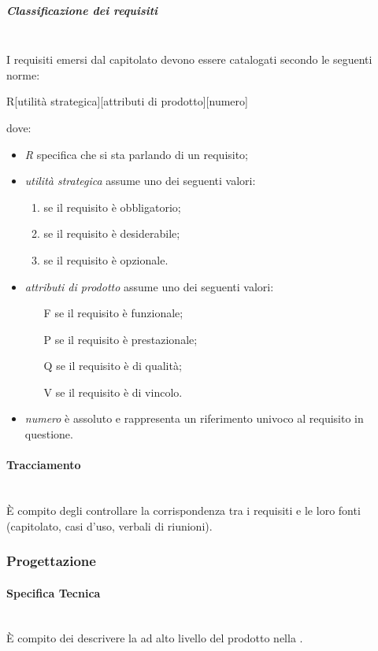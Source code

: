 \subparagraph{Classificazione dei requisiti}\mbox{}\\
I requisiti emersi dal capitolato devono essere catalogati secondo le seguenti norme:
\begin{center}
	R[utilità strategica][attributi di prodotto][numero]
\end{center}
dove:
\begin{itemize}
	\item \textit{R} specifica che si sta parlando di un requisito;
	\item \textit{utilità strategica} assume uno dei seguenti valori:
	\begin{enumerate}
		\item se il requisito è obbligatorio;
		\item se il requisito è desiderabile;
		\item se il requisito è opzionale.
	\end{enumerate}
	\item \textit{attributi di prodotto} assume uno dei seguenti valori:
	\begin{itemize}
		\item [F] se il requisito è funzionale;
		\item [P] se il requisito è prestazionale;
		\item [Q] se il requisito è di qualità;
		\item [V] se il requisito è di vincolo.
	\end{itemize}
	\item \textit{numero} è assoluto e rappresenta un riferimento univoco al requisito in questione.
\end{itemize}

\paragraph{Tracciamento}\mbox{}\\
\`{E} compito degli \Analisti{} controllare la corrispondenza tra i requisiti e le loro fonti (capitolato, casi d'uso, verbali di riunioni).

\subsubsection{Progettazione}
\paragraph{Specifica Tecnica}\mbox{}\\
\`{E} compito dei \Progettisti{} descrivere la \PA{} ad alto livello del prodotto nella \SpecificaTecnica.

